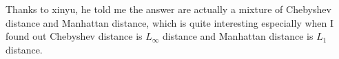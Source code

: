 \documentclass[12pt]{article}
\begin{document}
\begin{center}
\end{center}

Thanks to xinyu, he told me the answer are actually a mixture of Chebyshev distance and Manhattan distance, which is quite interesting especially when I found out Chebyshev distance is $L_{\infty}$ distance and Manhattan distance is $L_{1}$ distance.
\end{document}
